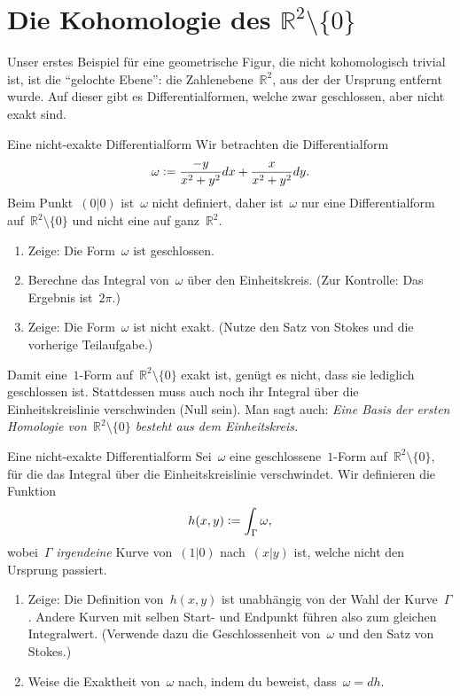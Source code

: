 \documentclass[twoside]{zirkelblatt1415}
\theoremstyle{definition}
\theoremstyle{plain}
\theoremstyle{remark}
\newcommand{\defeq}{\vcentcolon=}
\newcommand{\RR}{\mathbb{R}}
\begin{document}
\section{Die Kohomologie des $\RR^2 \setminus \{0\}$}

Unser erstes Beispiel für eine geometrische Figur, die nicht kohomologisch
trivial ist, ist die "`gelochte Ebene"': die Zahlenebene~$\RR^2$, aus der der
Ursprung entfernt wurde. Auf dieser gibt es Differentialformen, welche zwar
geschlossen, aber nicht exakt sind.

\begin{aufgabe}{Eine nicht-exakte Differentialform}
Wir betrachten die Differentialform
\[ \omega \defeq \frac{-y}{x^2+y^2} dx + \frac{x}{x^2+y^2} dy. \]
Beim Punkt~$(0|0)$ ist~$\omega$ nicht definiert, daher ist~$\omega$ nur eine
Differentialform auf~$\RR^2\setminus\{0\}$ und nicht eine auf ganz~$\RR^2$.

\begin{enumerate}
\item Zeige: Die Form~$\omega$ ist geschlossen.
\item Berechne das Integral von~$\omega$ über den Einheitskreis. (Zur
Kontrolle: Das Ergebnis ist~$2\pi$.)
\item Zeige: Die Form~$\omega$ ist nicht exakt. (Nutze den Satz von Stokes und
die vorherige Teilaufgabe.)
\end{enumerate}
\end{aufgabe}

Damit eine~$1$-Form auf~$\RR^2\setminus\{0\}$ exakt ist, genügt es nicht, dass
sie lediglich geschlossen ist. Stattdessen muss auch noch ihr Integral über die
Einheitskreislinie verschwinden (Null sein). Man sagt auch: \emph{Eine Basis
der ersten Homologie von~$\RR^2\setminus\{0\}$ besteht aus dem Einheitskreis.}

\begin{aufgabe}{Eine nicht-exakte Differentialform}
Sei~$\omega$ eine geschlossene~$1$-Form auf~$\RR^2\setminus\{0\}$, für die das
Integral über die Einheitskreislinie verschwindet. Wir definieren die Funktion
\[ h(x,y) \defeq \int_\Gamma \omega, \]
wobei~$\Gamma$ \emph{irgendeine} Kurve von~$(1|0)$ nach~$(x|y)$ ist, welche
nicht den Ursprung passiert.
\begin{enumerate}
\item Zeige: Die Definition von~$h(x,y)$ ist unabhängig von der Wahl der
Kurve~$\Gamma$. Andere Kurven mit selben Start- und Endpunkt führen also zum
gleichen Integralwert. (Verwende dazu die Geschlossenheit von~$\omega$ und den
Satz von Stokes.)
\item Weise die Exaktheit von~$\omega$ nach, indem du beweist,
dass~$\omega = dh$.
\end{enumerate}
\end{aufgabe}
\end{document}
